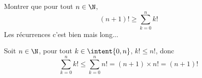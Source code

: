 



\begin{exercice}
Montrer que pour tout $n\in \N$, $$(n+1)! \geq \sum_{k=0}^n k! $$
\footnotesize{Les récurrences c'est bien mais long...}
\end{exercice}



\begin{correction}
Soit $n\in \N$, pour tout $k\in\intent{0,n} $, $k! \leq n! $, donc 
$$\sum_{k=0}^n k! \leq \sum_{k=0}^n n! = (n+1) \times  n ! =(n+1)!$$
\end{correction}